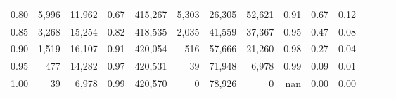 \begin{tabular}{rrrrrrrrrrrrrr}
0.80 &   5,996 &  11,962 &  0.67 &  415,267 &    5,303 &  26,305 &  52,621 &  0.91 &  0.67 &      0.12 \\
0.85 &   3,268 &  15,254 &  0.82 &  418,535 &    2,035 &  41,559 &  37,367 &  0.95 &  0.47 &      0.08 \\
0.90 &   1,519 &  16,107 &  0.91 &  420,054 &      516 &  57,666 &  21,260 &  0.98 &  0.27 &      0.04 \\
0.95 &     477 &  14,282 &  0.97 &  420,531 &       39 &  71,948 &   6,978 &  0.99 &  0.09 &      0.01 \\
1.00 &      39 &   6,978 &  0.99 &  420,570 &        0 &  78,926 &       0 &   nan &  0.00 &      0.00 \\
\bottomrule
\end{tabular}
